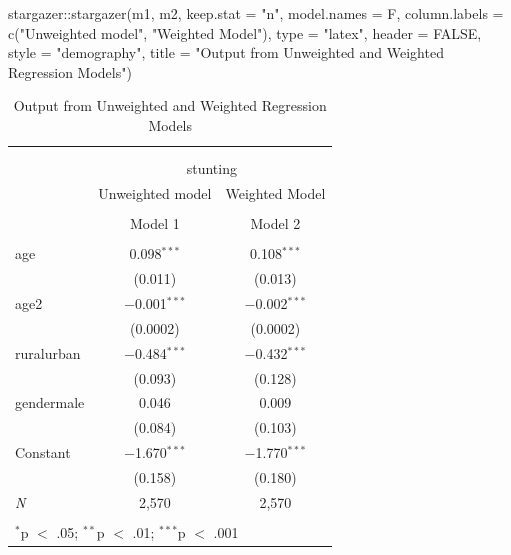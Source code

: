 \documentclass[
  letterpaper,
  DIV=11,
  numbers=noendperiod]{scrreprt}
\newenvironment{Shaded}{\begin{snugshade}}{\end{snugshade}}
\newcommand{\AttributeTok}[1]{\textcolor[rgb]{0.40,0.45,0.13}{#1}}
\newcommand{\ConstantTok}[1]{\textcolor[rgb]{0.56,0.35,0.01}{#1}}
\newcommand{\FunctionTok}[1]{\textcolor[rgb]{0.28,0.35,0.67}{#1}}
\newcommand{\NormalTok}[1]{\textcolor[rgb]{0.00,0.23,0.31}{#1}}
\newcommand{\SpecialCharTok}[1]{\textcolor[rgb]{0.37,0.37,0.37}{#1}}
\newcommand{\StringTok}[1]{\textcolor[rgb]{0.13,0.47,0.30}{#1}}
\begin{document}
\begin{Shaded}
\begin{Highlighting}[]
\NormalTok{stargazer}\SpecialCharTok{::}\FunctionTok{stargazer}\NormalTok{(m1, m2,}
                     \AttributeTok{keep.stat =} \StringTok{"n"}\NormalTok{,}
                     \AttributeTok{model.names =}\NormalTok{ F,}
                     \AttributeTok{column.labels =} \FunctionTok{c}\NormalTok{(}\StringTok{"Unweighted model"}\NormalTok{, }\StringTok{"Weighted Model"}\NormalTok{),}
                     \AttributeTok{type =} \StringTok{"latex"}\NormalTok{,}
                     \AttributeTok{header =} \ConstantTok{FALSE}\NormalTok{, }
                     \AttributeTok{style =} \StringTok{"demography"}\NormalTok{,}
                     \AttributeTok{title =} \StringTok{"Output from Unweighted and Weighted Regression Models"}\NormalTok{)}
\end{Highlighting}
\end{Shaded}

\begin{table}[!htbp] \centering 
  \caption{Output from Unweighted and Weighted Regression Models} 
  \label{} 
\begin{tabular}{@{\extracolsep{5pt}}lcc} 
\\[-1.8ex]\hline \\[-1.8ex] 
\\[-1.8ex] & \multicolumn{2}{c}{stunting} \\ 
 & Unweighted model & Weighted Model \\ 
\\[-1.8ex] & Model 1 & Model 2\\ 
\hline \\[-1.8ex] 
 age & 0.098$^{***}$ & 0.108$^{***}$ \\ 
  & (0.011) & (0.013) \\ 
  age2 & $-$0.001$^{***}$ & $-$0.002$^{***}$ \\ 
  & (0.0002) & (0.0002) \\ 
  ruralurban & $-$0.484$^{***}$ & $-$0.432$^{***}$ \\ 
  & (0.093) & (0.128) \\ 
  gendermale & 0.046 & 0.009 \\ 
  & (0.084) & (0.103) \\ 
  Constant & $-$1.670$^{***}$ & $-$1.770$^{***}$ \\ 
  & (0.158) & (0.180) \\ 
 \textit{N} & 2,570 & 2,570 \\ 
\hline \\[-1.8ex] 
\multicolumn{3}{l}{$^{*}$p $<$ .05; $^{**}$p $<$ .01; $^{***}$p $<$ .001} \\ 
\end{tabular} 
\end{table}
\end{document}
